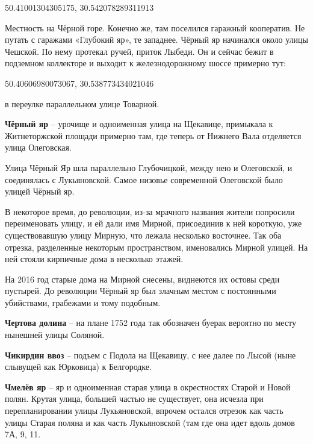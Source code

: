 50.41001304305175, 30.542078289311913

Местность на Чёрной горе. Конечно же, там поселился гаражный кооператив. Не путать с гаражами «Глубокий яр», те западнее. Чёрный яр начинался около улицы Чешской. По нему протекал ручей, приток Лыбеди. Он и сейчас бежит в подземном коллекторе и выходит к железнодорожному шоссе примерно тут:

50.40606980073067, 30.538773434021046

в переулке параллельном улице Товарной.\\

\medskip

\textbf{Чёрный яр} – урочище и одноименная улица на Щекавице, примыкала к Житнеторжской площади примерно там, где теперь от Нижнего Вала отделяется улица Олеговская. 

Улица Чёрный Яр шла параллельно Глубочицкой, между нею и Олеговской, и соединялась с Лукьяновской. Самое низовье современной Олеговской было улицей Чёрный яр. 

В некоторое время, до революции, из-за мрачного названия жители попросили переименовать улицу, и ей дали имя Мирной, присоединив к ней короткую, уже существовавшую улицу Мирную, что лежала несколько восточнее. Так оба отрезка, разделенные некоторым пространством, именовались Мирной улицей. На ней стояли кирпичные дома в несколько этажей.

На 2016 год старые дома на Мирной снесены, виднеются их остовы среди пустырей. До революции Чёрный яр был злачным местом с постоянными убийствами, грабежами и тому подобным.\\

\medskip

\textbf{Чертова долина} – на плане 1752 года так обозначен буерак вероятно по месту нынешней улицы Соляной.\\

\medskip

\textbf{Чикирдин ввоз} – подъем с Подола на Щекавицу, с нее далее по Лысой (ныне слывущей как Юрковица) к Белгородке.\\

\medskip



\textbf{Чмелёв яр} – яр и одноименная старая улица в окрестностях Старой и Новой полян. Крутая улица, большей частью не существует, она исчезла при перепланировании улицы Лукьяновской, впрочем остался отрезок как часть улицы Старая поляна и как часть Лукьяновской (там где она идет вдоль домов 7А, 9, 11.

